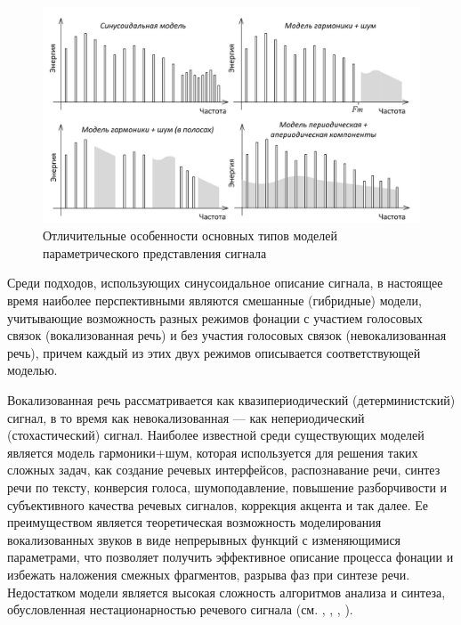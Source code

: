 \begin{figure}[H]
    \centerline{
        \includegraphics[scale=1.0, width=1.0\textwidth]{author/part4/figures/ch43_fig05_signal-model-types-ru.png}
    }
    \caption{Отличительные особенности  основных типов моделей параметрического представления сигнала}
    \label{fig:signal-model-types-ru}
\end{figure}

Среди подходов, использующих синусоидальное описание сигнала, в настоящее время наиболее перспективными являются смешанные (гибридные) модели, учитывающие возможность разных режимов фонации с участием голосовых связок (вокализованная речь) и без участия голосовых связок (невокализованная речь), причем каждый из этих двух режимов описывается соответствующей моделью. 

Вокализованная речь рассматривается как квазипериодический (детерминистский) сигнал, в то время как невокализованная --- как непериодический (стохастический) сигнал. Наиболее известной среди существующих моделей является модель гармоники+шум, которая используется для решения таких сложных задач, как создание речевых интерфейсов, распознавание речи, синтез речи по тексту, конверсия голоса, шумоподавление, повышение разборчивости и субъективного качества речевых сигналов, коррекция акцента и так далее. Ее преимуществом является теоретическая возможность моделирования вокализованных звуков в виде непрерывных функций с изменяющимися параметрами, что позволяет получить эффективное описание процесса фонации и избежать наложения смежных фрагментов, разрыва фаз при синтезе речи. Недостатком модели является высокая сложность алгоритмов анализа и синтеза, обусловленная нестационарностью речевого сигнала (см. , , , ). 

